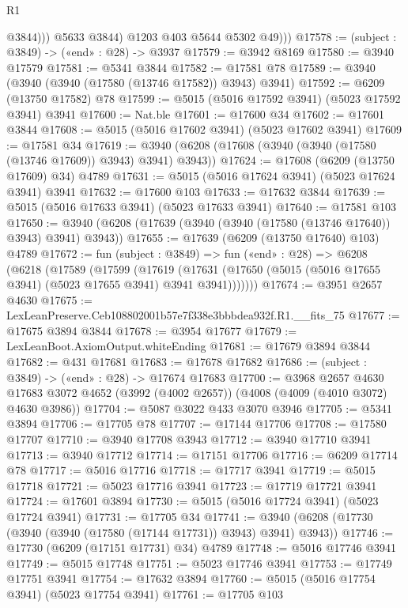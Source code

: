 \begin{lexlean}{R1}
\begin{coremodule}
                  @3844)))
            @5633
            @3844)
          @1203
          @403
          @5644
          @5302
          @49)))
@17578 := (subject : @3849) -> («end» : @28) -> @3937
@17579 := @3942 @8169
@17580 := @3940 @17579
@17581 := @5341 @3844
@17582 := @17581 @78
@17589 := @3940 (@3940 (@3940 (@17580 (@13746 @17582)) @3943) @3941)
@17592 := @6209 (@13750 @17582) @78
@17599 := @5015 (@5016 @17592 @3941) (@5023 @17592 @3941) @3941
@17600 := Nat.ble
@17601 := @17600 @34
@17602 := @17601 @3844
@17608 := @5015 (@5016 @17602 @3941) (@5023 @17602 @3941)
@17609 := @17581 @34
@17619 := @3940 (@6208 (@17608 (@3940 (@3940 (@17580 (@13746 @17609)) @3943) @3941) @3943))
@17624 := @17608 (@6209 (@13750 @17609) @34) @4789
@17631 := @5015 (@5016 @17624 @3941) (@5023 @17624 @3941) @3941
@17632 := @17600 @103
@17633 := @17632 @3844
@17639 := @5015 (@5016 @17633 @3941) (@5023 @17633 @3941)
@17640 := @17581 @103
@17650 := @3940 (@6208 (@17639 (@3940 (@3940 (@17580 (@13746 @17640)) @3943) @3941) @3943))
@17655 := @17639 (@6209 (@13750 @17640) @103) @4789
@17672 := fun (subject : @3849) =>
  fun («end» : @28) =>
  @6208
    (@6218
      (@17589
        (@17599
          (@17619
            (@17631 (@17650 (@5015 (@5016 @17655 @3941) (@5023 @17655 @3941) @3941 @3941)))))))
@17674 := @3951 @2657 @4630
@17675 := LexLeanPreserve.Ceb108802001b57e7f338e3bbbdea932f.R1.__fits_75
@17677 := @17675 @3894 @3844
@17678 := @3954 @17677
@17679 := LexLeanBoot.AxiomOutput.whiteEnding
@17681 := @17679 @3894 @3844
@17682 := @431 @17681
@17683 := @17678 @17682
@17686 := (subject : @3849) -> («end» : @28) -> @17674 @17683
@17700 := @3968
    @2657
    @4630
    @17683
    @3072
    @4652
    (@3992 (@4002 @2657))
    (@4008 (@4009 (@4010 @3072) @4630 @3986))
@17704 := @5087 @3022 @433 @3070 @3946
@17705 := @5341 @3894
@17706 := @17705 @78
@17707 := @17144 @17706
@17708 := @17580 @17707
@17710 := @3940 @17708 @3943
@17712 := @3940 @17710 @3941
@17713 := @3940 @17712
@17714 := @17151 @17706
@17716 := @6209 @17714 @78
@17717 := @5016 @17716
@17718 := @17717 @3941
@17719 := @5015 @17718
@17721 := @5023 @17716 @3941
@17723 := @17719 @17721 @3941
@17724 := @17601 @3894
@17730 := @5015 (@5016 @17724 @3941) (@5023 @17724 @3941)
@17731 := @17705 @34
@17741 := @3940 (@6208 (@17730 (@3940 (@3940 (@17580 (@17144 @17731)) @3943) @3941) @3943))
@17746 := @17730 (@6209 (@17151 @17731) @34) @4789
@17748 := @5016 @17746 @3941
@17749 := @5015 @17748
@17751 := @5023 @17746 @3941
@17753 := @17749 @17751 @3941
@17754 := @17632 @3894
@17760 := @5015 (@5016 @17754 @3941) (@5023 @17754 @3941)
@17761 := @17705 @103

\end{coremodule}
\end{lexlean}

